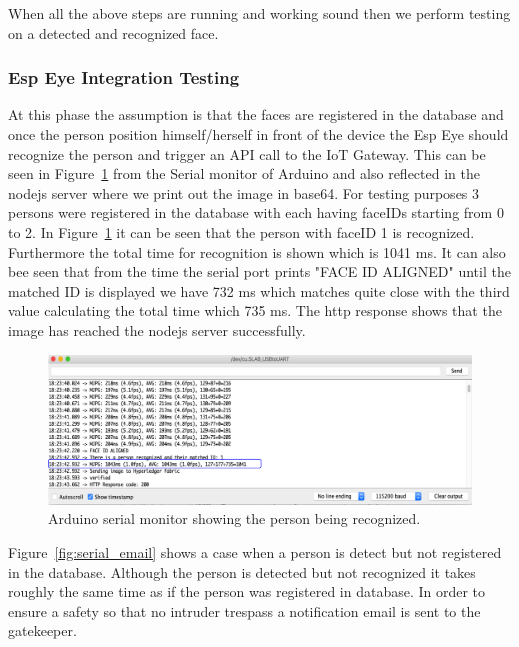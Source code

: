 When all the above steps are running and working sound then we perform testing on a detected and recognized face. 

\subsubsection{Esp Eye Integration Testing}

At this phase the assumption is that the faces are registered in the database and once the person position himself/herself in front of the device the Esp Eye should recognize the person and trigger an API call to the IoT Gateway. This can be seen in Figure~\ref{fig:serial_monitor} from the Serial monitor of Arduino and also reflected in the nodejs server where we print out the image in base64.  For testing purposes 3 persons were registered in the database with each having faceIDs starting from 0 to 2. In Figure~\ref{fig:serial_monitor} it can be seen that the person with faceID 1 is recognized. Furthermore the total time for recognition is shown which is 1041 ms. It can also bee seen that from the time the serial port prints "FACE ID ALIGNED"  until the matched ID is displayed we have 732 ms which matches quite close with the third value calculating the total time which 735 ms. The http response shows that the image has reached the nodejs server successfully. 



\begin{figure}[!htb]
    \centering
    \includegraphics[width=1\textwidth]{figures/serialport1_highlight.png}
    \caption{Arduino serial monitor showing the person being recognized.}
    \label{fig:serial_monitor}
\end{figure}

Figure~\ref{fig:serial_email} shows a case when a person is detect but not registered in the database. Although the person is detected but not recognized it takes roughly the same time as if the person was registered in database. In order to ensure a safety so that no intruder trespass a notification email is sent to the gatekeeper. 

